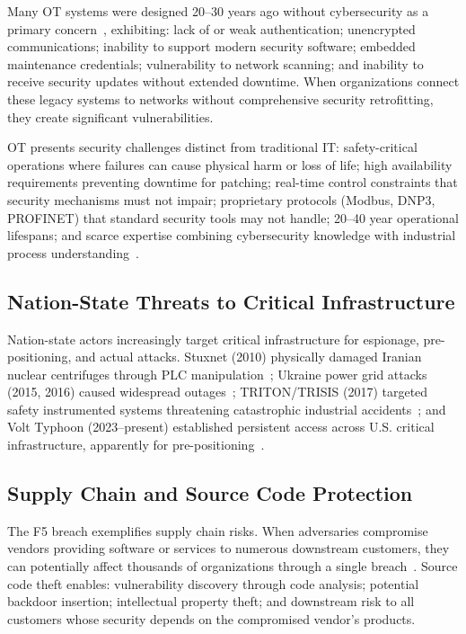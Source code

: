 \documentclass[sigconf,nonacm]{acmart}
\begin{document}
Many OT systems were designed 20--30 years ago without cybersecurity as a primary
concern~\cite{lee2025dragos}, exhibiting: lack of or weak authentication; unencrypted
communications; inability to support modern security software; embedded maintenance
credentials; vulnerability to network scanning; and inability to receive security
updates without extended downtime. When organizations connect these legacy systems to
networks without comprehensive security retrofitting, they create significant
vulnerabilities.

OT presents security challenges distinct from traditional IT: safety-critical operations
where failures can cause physical harm or loss of life; high availability requirements
preventing downtime for patching; real-time control constraints that security mechanisms
must not impair; proprietary protocols (Modbus, DNP3, PROFINET) that standard security
tools may not handle; 20--40 year operational lifespans; and scarce expertise combining
cybersecurity knowledge with industrial process understanding~\cite{stouffer2023ot}.

\subsection{Nation-State Threats to Critical Infrastructure}

Nation-state actors increasingly target critical infrastructure for espionage,
pre-positioning, and actual attacks. Stuxnet (2010) physically damaged Iranian nuclear
centrifuges through PLC manipulation~\cite{langner2023stuxnet}; Ukraine power grid
attacks (2015, 2016) caused widespread outages~\cite{case2021ukraine}; TRITON/TRISIS
(2017) targeted safety instrumented systems threatening catastrophic industrial
accidents~\cite{johnson2023triton}; and Volt Typhoon (2023--present) established
persistent access across U.S. critical infrastructure, apparently for
pre-positioning~\cite{cisa2024volt}.

\subsection{Supply Chain and Source Code Protection}

The F5 breach exemplifies supply chain risks. When adversaries compromise vendors
providing software or services to numerous downstream customers, they can potentially
affect thousands of organizations through a single breach~\cite{boyens2024supply}. Source
code theft enables: vulnerability discovery through code analysis; potential backdoor
insertion; intellectual property theft; and downstream risk to all customers whose
security depends on the compromised vendor's products.
\end{document}
